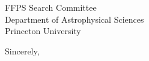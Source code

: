 \documentclass[12pt]{letter}
\begin{document}
\begin{letter}{
               FFPS Search Committee \\
               Department of Astrophysical Sciences \\
               Princeton University
           }
\closing{Sincerely,}
\vspace{-0.9in}
\\
\end{letter}
\end{document}
